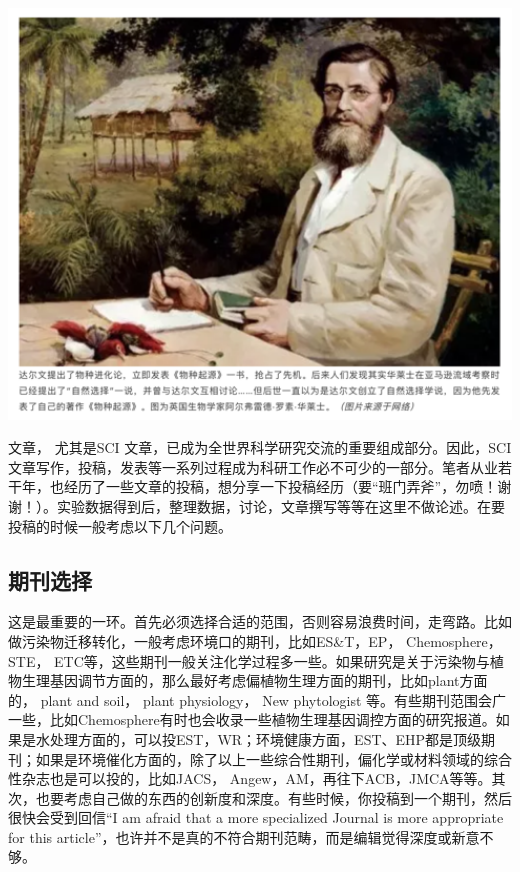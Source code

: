 \documentclass[]{book}
\begin{document}
\includegraphics[width=6.67in]{images/tougao1}

文章， 尤其是SCI 文章，已成为全世界科学研究交流的重要组成部分。因此，SCI文章写作，投稿，发表等一系列过程成为科研工作必不可少的一部分。笔者从业若干年，也经历了一些文章的投稿，想分享一下投稿经历（要``班门弄斧''，勿喷！谢谢！）。实验数据得到后，整理数据，讨论，文章撰写等等在这里不做论述。在要投稿的时候一般考虑以下几个问题。

\hypertarget{ux671fux520aux9009ux62e9}{%
\subsection{期刊选择}\label{ux671fux520aux9009ux62e9}}

这是最重要的一环。首先必须选择合适的范围，否则容易浪费时间，走弯路。比如做污染物迁移转化，一般考虑环境口的期刊，比如ES\&T，EP， Chemosphere， STE， ETC等，这些期刊一般关注化学过程多一些。如果研究是关于污染物与植物生理基因调节方面的，那么最好考虑偏植物生理方面的期刊，比如plant方面的， plant and soil， plant physiology， New phytologist 等。有些期刊范围会广一些，比如Chemosphere有时也会收录一些植物生理基因调控方面的研究报道。如果是水处理方面的，可以投EST，WR；环境健康方面，EST、EHP都是顶级期刊；如果是环境催化方面的，除了以上一些综合性期刊，偏化学或材料领域的综合性杂志也是可以投的，比如JACS， Angew，AM，再往下ACB，JMCA等等。其次，也要考虑自己做的东西的创新度和深度。有些时候，你投稿到一个期刊，然后很快会受到回信``I am afraid that a more specialized Journal is more appropriate for this article''，也许并不是真的不符合期刊范畴，而是编辑觉得深度或新意不够。
\end{document}

